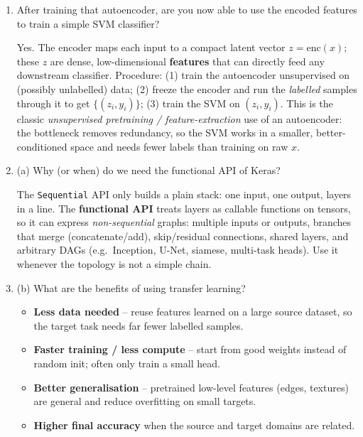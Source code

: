 \documentclass[10pt,a4paper]{article}
\newcommand{\q}[1]{\item #1}
\begin{document}
\begin{enumerate}[leftmargin=*,label=\textbf{Q\arabic*.}]
\q After training that autoencoder, are you now able to use the encoded features to train a simple SVM classifier?
\begin{answerbox}
Yes. The encoder maps each input to a compact latent vector $z=\mathrm{enc}(x)$; these $z$ are dense, low-dimensional \textbf{features} that can directly feed any downstream classifier. Procedure: (1) train the autoencoder unsupervised on (possibly unlabelled) data; (2) freeze the encoder and run the \emph{labelled} samples through it to get $\{(z_i,y_i)\}$; (3) train the SVM on $(z_i,y_i)$. This is the classic \emph{unsupervised pretraining / feature-extraction} use of an autoencoder: the bottleneck removes redundancy, so the SVM works in a smaller, better-conditioned space and needs fewer labels than training on raw $x$.
\end{answerbox}

\q (a) Why (or when) do we need the functional API of Keras?
\begin{answerbox}
The \texttt{Sequential} API only builds a plain stack: one input, one output, layers in a line. The \textbf{functional API} treats layers as callable functions on tensors, so it can express \emph{non-sequential} graphs: multiple inputs or outputs, branches that merge (concatenate/add), skip/residual connections, shared layers, and arbitrary DAGs (e.g.\ Inception, U-Net, siamese, multi-task heads). Use it whenever the topology is not a simple chain.
\end{answerbox}

\q (b) What are the benefits of using transfer learning?
\begin{answerbox}
\begin{itemize}[leftmargin=1.2em]
  \item \textbf{Less data needed} -- reuse features learned on a large source dataset, so the target task needs far fewer labelled samples.
  \item \textbf{Faster training / less compute} -- start from good weights instead of random init; often only train a small head.
  \item \textbf{Better generalisation} -- pretrained low-level features (edges, textures) are general and reduce overfitting on small targets.
  \item \textbf{Higher final accuracy} when the source and target domains are related.
\end{itemize}
\end{answerbox}


\end{enumerate}
\end{document}

